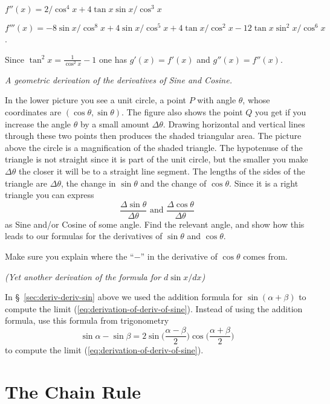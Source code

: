 \begin{multicols}{2}
$f''(x) = 2/\cos^4 x + 4\tan x \sin x/\cos^3 x$

$f'''(x) = -8\sin x/\cos^8 x + 4\sin x/\cos^5 x
           + 4\tan x/\cos^2x - 12\tan x \sin^2x/\cos^6x$.

Since $\tan^2 x= \frac{1}{\cos^2 x}-1$ one has $g'(x) = f'(x)$ and
$g''(x) = f''(x)$.
\endanswer

\problem \textit{A geometric derivation of the derivatives of Sine and Cosine.}

\centerline{}

In the lower picture you see a unit circle, a point $P$ with angle $ \theta $, whose
coordinates are $(\cos \theta, \sin \theta)$.  The figure also shows the point $Q$
you get if you increase the angle $\theta$ by a small amount
$\Delta\theta$. Drawing horizontal and vertical lines through these two points
then produces the shaded triangular area.  The picture above the circle is a
magnification of the shaded triangle.  The hypotenuse of the triangle is not
straight since it is part of the unit circle, but the smaller you make
$\Delta\theta$ the closer it will be to a straight line segment.  The lengths of
the sides of the triangle are $\Delta\theta$, the change in $\sin\theta$ and the
change of $\cos \theta$.  Since it is a right triangle you can express
\[
\frac{\Delta\sin \theta} {\Delta\theta} \text{ and }
\frac{\Delta\cos\theta} {\Delta\theta}
\]
as Sine and/or Cosine of some angle.  Find the relevant angle, and show how this
leads to our formulas for the derivatives of $\sin\theta$ and $\cos\theta$.

Make sure you explain where the ``$-$'' in the derivative of $\cos\theta$ comes from.

\problem \groupproblem \textit{(Yet another derivation of the formula for 
$d\sin x / dx$)}

In \S~\ref{sec:deriv-deriv-sin} above we used the addition formula for
$\sin(\alpha+\beta)$ to compute the limit
(\ref{eq:derivation-of-deriv-of-sine}).  Instead of using the addition
formula, use this formula from trigonometry
\[
\sin\alpha - \sin\beta
=
2\sin \bigl(\frac{\alpha-\beta} {2}\bigr) \cos\bigl(\frac{\alpha+\beta} {2}\bigr)
\]
to compute the limit (\ref{eq:derivation-of-deriv-of-sine}).

\end{multicols}



\noproblemfont
\section{The Chain Rule}

